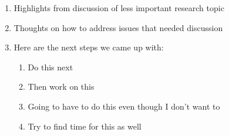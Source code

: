 \begin{enumerate}

    \item Highlights from discussion of less important research topic

    \item Thoughts on how to address issues that needed discussion

    \item Here are the next steps we came up with:

        \begin{enumerate}

            \item Do this next

            \item Then work on this

            \item Going to have to do this even though I don't want to

            \item Try to find time for this as well

        \end{enumerate}

\end{enumerate}

